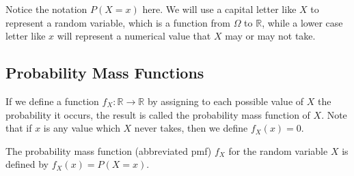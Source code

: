 \rmk Notice the notation $P(X = x)$ here. We will use a capital letter like $X$ to represent a random variable, which is a function from $\Omega$ to $\mathbb{R}$, while a lower case letter like $x$ will represent a numerical value that $X$ may or may not take.

\subsection*{Probability Mass Functions}
\par
If we define a function $f_X: \mathbb{R} \to \mathbb{R}$ by assigning to each possible value of $X$ the probability it occurs, the result is called the probability mass function of $X$. Note that if $x$ is any value which $X$ never takes, then we define $f_X(x) = 0$.

\begin{defn}
The probability mass function (abbreviated pmf) $f_X$ for the random variable $X$ is defined by $f_X(x) = P(X = x)$.
\end{defn}


